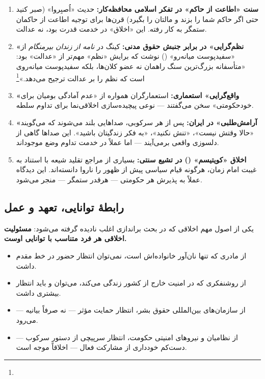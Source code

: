 \begin{tcolorbox}[enemybox, title={\textbf{نمونه‌های اخلاقِ مانع آزادی}}]
\begin{enumerate}
\item \textbf{سنت «اطاعت از حاکم» در تفکر اسلامی محافظه‌کار:} حدیث 
«اُصبِروا» (صبر کنید حتی اگر حاکم شما را بزند و مالتان را بگیرد) 
قرن‌ها برای توجیه اطاعت از حاکمان ستمگر به کار رفته. این «اخلاق» 
در خدمت قدرت بود، نه عدالت.

\item \textbf{«نظم‌گرایی» در برابر جنبش حقوق مدنی:} کینگ در \textit{نامه 
از زندان بیرمنگام} از «سفیدپوست میانه‌رو» () نوشت 
که برایش «نظم» مهم‌تر از «عدالت» بود: «متأسفانه بزرگ‌ترین سنگ راهمان نه 
عضو کلان‌ها، بلکه سفیدپوست میانه‌روی است که نظم را بر عدالت ترجیح 
می‌دهد.»\footnote{}

\item \textbf{«واقع‌گرایی» استعماری:} استعمارگران همواره از «عدم آمادگی 
بومیان برای خودحکومتی» سخن می‌گفتند — نوعی 
پیچیده‌سازی اخلاقی‌نما برای تداوم سلطه.

\item \textbf{«آرامش‌طلبی» در ایران:} پس از هر سرکوبی، صداهایی بلند 
می‌شوند که می‌گویند «حالا وقتش نیست»، «تنش نکنید»، «به فکر زندگیتان 
باشید». این صداها گاهی از دلسوزی واقعی برمی‌آیند — اما عملاً در خدمت 
تداوم وضع موجود‌اند.

\item \textbf{اخلاق «کویتیسم» () در تشیع سنتی:} 
بسیاری از مراجع تقلید شیعه با استناد به غیبت امام زمان، هرگونه قیام 
سیاسی پیش از ظهور را ناروا دانسته‌اند. این دیدگاه عملاً به پذیرش هر 
حکومتی — هرقدر ستمگر — منجر می‌شود.
\end{enumerate}
\end{tcolorbox}

\subsection{رابطهٔ توانایی، تعهد و عمل}

\begin{tcolorbox}[defbox, title={\textbf{اصل تناسب مسئولیت با توانایی}}]
یکی از اصول مهم اخلاقی که در بحث براندازی اغلب نادیده گرفته می‌شود:
\textbf{مسئولیت اخلاقی هر فرد متناسب با توانایی اوست.}

\begin{itemize}
\item از مادری که تنها نان‌آور خانواده‌اش است، نمی‌توان انتظار حضور در 
خط مقدم داشت.
\item از روشنفکری که در امنیت خارج از کشور زندگی می‌کند، می‌توان و باید 
انتظار بیشتری داشت.
\item از سازمان‌های بین‌المللی حقوق بشر، انتظار حمایت مؤثر — نه صرفاً 
بیانیه — می‌رود.
\item از نظامیان و نیروهای امنیتی حکومت، انتظار سرپیچی از دستور 
سرکوب — دست‌کم خودداری از مشارکت فعال — اخلاقاً موجه است.
\end{itemize}
\end{tcolorbox}

